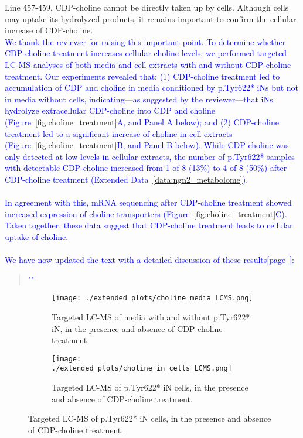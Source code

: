 Line 457-459, CDP-choline cannot be directly taken up by cells. Although cells may uptake its hydrolyzed products, it remains important to confirm the cellular increase of CDP-choline.\\
\textcolor{blue}{We thank the reviewer for raising this important point. To determine whether CDP-choline treatment increases cellular choline levels, we performed targeted LC-MS analyses of both media and cell extracts with and without CDP-choline treatment. Our experiments revealed that: (1) CDP-choline treatment led to accumulation of CDP and choline in media conditioned by p.Tyr622* iNs but not in media without cells, indicating—as suggested by the reviewer—that iNs hydrolyze extracellular CDP-choline into CDP and choline (Figure~\ref{fig:choline_treatment}A, and Panel A below); and (2) CDP-choline treatment led to a  significant increase of choline in cell extracts (Figure~\ref{fig:choline_treatment}B, and Panel B below). While CDP-choline was only detected at low levels in cellular extracts, the number of  p.Tyr622* samples with detectable CDP-choline increased from 1 of 8 (13\%) to 4 of 8 (50\%) after CDP-choline treatment (Extended Data~\ref{data:ngn2_metabolome}).}\\\\
\textcolor{blue}{In agreement with this, mRNA sequencing after CDP-choline treatment showed increased expression of choline transporters (Figure~\ref{fig:choline_treatment}C). Taken together, these data suggest that CDP-choline treatment leads to cellular uptake of choline.}\\\\
\textcolor{blue}{We have now updated the text with a detailed discussion of these results[page~\pageref{quoteD-label}]:}
\begin{quote}
	\textcolor{blue}{"\quoteD"}
\end{quote}

\begin{figure}[H] 
	\begin{subfigure}[t]{\textwidth}
		\caption{Targeted LC-MS of media with and without p.Tyr622* iN, in the presence and absence of CDP-choline treatment.}
		\texttt{[image: ./extended\_plots/choline\_media\_LCMS.png]}        
	\end{subfigure}
	\centering
	\begin{subfigure}[t]{.4\textwidth}
		\caption{Targeted LC-MS of p.Tyr622* iN cells, in the presence and absence of CDP-choline treatment.}
		\texttt{[image: ./extended\_plots/choline\_in\_cells\_LCMS.png]}        
	\end{subfigure}
\end{figure}

